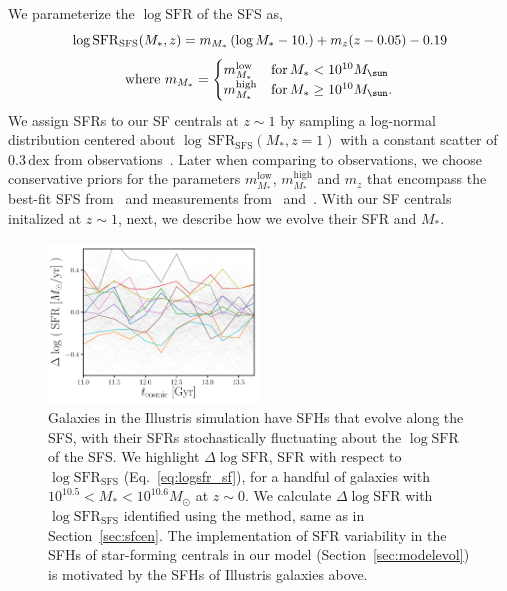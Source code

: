 \documentclass[12pt, letterpaper, preprint, tighten]{aastex62}
\newcommand{\beq}{\begin{equation}}
\newcommand{\eeq}{\end{equation}}
\newcommand{\logsfr}{\log\mathrm{SFR}}
\newcommand{\logsfrsfs}{\log\mathrm{SFR}_\mathrm{SFS}}
\begin{document}
We parameterize the $\log\mathrm{SFR}$ of the SFS as,
\beq \label{eq:logsfr_ms}
\logsfr_{\rm SFS}(M_*, z) =  m_{M_*}\,(\log M_* - 10.) + m_z (z - 0.05) - 0.19
\eeq
\begin{equation*}
{\rm where}~m_{M_*} = \begin{cases}
m^\mathrm{low}_{M_*} & \text{for}\,M_* < 10^{10}M_\sun \\
m^\mathrm{high}_{M_*} & \text{for}\,M_* \geq 10^{10}M_\sun.
\end{cases}
\end{equation*}
We assign SFRs to our SF centrals at $z\sim1$ by sampling a log-normal
distribution centered about $\log\,\mathrm{SFR}_\mathrm{SFS}(M_*, z=1)$
with a constant scatter of $0.3\,\mathrm{dex}$ from observations~\citep{daddi2007, noeske2007, magdis2012, whitaker2012}.
Later when comparing to observations, we choose conservative priors
for the parameters $m^\mathrm{low}_{M_*}$, $m^\mathrm{high}_{M_*}$ and $m_z$
that encompass the best-fit SFS from~\cite{speagle2014} and measurements
from~\cite{moustakas2013} and~\cite{lee2015}. With our SF centrals initalized
at $z \sim 1$, next, we describe how we evolve their SFR and $M_*$.

\begin{figure}
\begin{center}
\includegraphics[width=0.5\textwidth]{figs/illustris_sfh.pdf}
    \caption{Galaxies in the Illustris simulation have SFHs that evolve along the
    SFS, with their SFRs stochastically fluctuating about the $\logsfr$ of the SFS.
    We highlight $\Delta \logsfr$, SFR with respect to $\logsfrsfs$ (Eq.~\ref{eq:logsfr_sf}),
    for a handful of galaxies with $10^{10.5}< M_* < 10^{10.6}M_\odot$ at $z\sim0$.
    We calculate $\Delta \logsfr$ with $\logsfrsfs$ identified using the \cite{hahn2018a}
    method, same as in Section~\ref{sec:sfcen}. The implementation of $\mathrm{SFR}$
    variability in the SFHs of star-forming centrals in our model (Section~\ref{sec:modelevol})
    is motivated by the SFHs of Illustris galaxies above.
    }
\label{fig:illsfh}
\end{center}
\end{figure}
\end{document}
